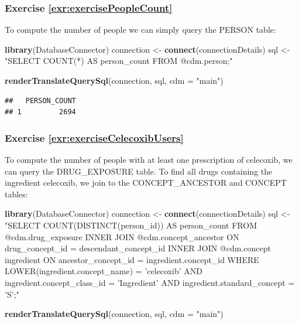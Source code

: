 \documentclass[11pt]{book}
\newenvironment{Shaded}{\begin{snugshade}}{\end{snugshade}}
\newcommand{\DataTypeTok}[1]{\textcolor[rgb]{0.13,0.29,0.53}{#1}}
\newcommand{\KeywordTok}[1]{\textcolor[rgb]{0.13,0.29,0.53}{\textbf{#1}}}
\newcommand{\NormalTok}[1]{#1}
\newcommand{\StringTok}[1]{\textcolor[rgb]{0.31,0.60,0.02}{#1}}
\theoremstyle{definition}
\theoremstyle{definition}
\theoremstyle{definition}
\theoremstyle{remark}
\begin{document}
\hypertarget{exercise-refexrexercisepeoplecount}{%
\subsubsection*{Exercise \ref{exr:exercisePeopleCount}}\label{exercise-refexrexercisepeoplecount}}

To compute the number of people we can simply query the PERSON table:

\begin{Shaded}
\begin{Highlighting}[]
\KeywordTok{library}\NormalTok{(DatabaseConnector)}
\NormalTok{connection <-}\StringTok{ }\KeywordTok{connect}\NormalTok{(connectionDetails)}
\NormalTok{sql <-}\StringTok{ "SELECT COUNT(*) AS person_count}
\StringTok{FROM @cdm.person;"}

\KeywordTok{renderTranslateQuerySql}\NormalTok{(connection, sql, }\DataTypeTok{cdm =} \StringTok{"main"}\NormalTok{)}
\end{Highlighting}
\end{Shaded}

\begin{verbatim}
##   PERSON_COUNT
## 1         2694
\end{verbatim}

\hypertarget{exercise-refexrexercisecelecoxibusers}{%
\subsubsection*{Exercise \ref{exr:exerciseCelecoxibUsers}}\label{exercise-refexrexercisecelecoxibusers}}

To compute the number of people with at least one prescription of celecoxib, we can query the DRUG\_EXPOSURE table. To find all drugs containing the ingredient celecoxib, we join to the CONCEPT\_ANCESTOR and CONCEPT tables:

\begin{Shaded}
\begin{Highlighting}[]
\KeywordTok{library}\NormalTok{(DatabaseConnector)}
\NormalTok{connection <-}\StringTok{ }\KeywordTok{connect}\NormalTok{(connectionDetails)}
\NormalTok{sql <-}\StringTok{ "SELECT COUNT(DISTINCT(person_id)) AS person_count}
\StringTok{FROM @cdm.drug_exposure}
\StringTok{INNER JOIN @cdm.concept_ancestor}
\StringTok{  ON drug_concept_id = descendant_concept_id}
\StringTok{INNER JOIN @cdm.concept ingredient}
\StringTok{  ON ancestor_concept_id = ingredient.concept_id}
\StringTok{WHERE LOWER(ingredient.concept_name) = 'celecoxib'}
\StringTok{  AND ingredient.concept_class_id = 'Ingredient'}
\StringTok{  AND ingredient.standard_concept = 'S';"}

\KeywordTok{renderTranslateQuerySql}\NormalTok{(connection, sql, }\DataTypeTok{cdm =} \StringTok{"main"}\NormalTok{)}
\end{Highlighting}
\end{Shaded}
\end{document}
